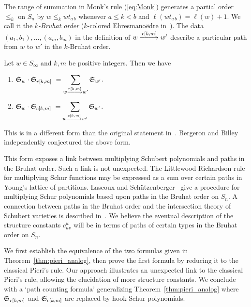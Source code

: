 The range of summation in Monk's rule (\ref{eq:Monk}) generates a partial 
order $\leq_k$ on $S_n$ by $w \leq_k w  t_{a\,b}$ whenever
$a\leq k<b$ and $\ell(w t_{a\,b}) = \ell(w)+1$.
We call it the {\em $k$-Bruhat order} 
($k$-colored Ehresmano\"edre 
in~\cite{Lascoux_Schutzenberger_Symmetry}).
The data $(a_1,b_1), \ldots,(a_m,b_m)$ in the definition
of $w\rkm w'$ describe a particular path from 
$w$ to $w'$ in the $k$-Bruhat order.
\bigskip


\begin{thm} \label{thm:pieri_analog}
Let $w\in S_{\infty}$ and $k,m$ be positive integers.
Then we have
\begin{enumerate}

\item ${\displaystyle 
{\frak S}_{w}\cdot {\frak S}_{r[k,m]} \ 
= \sum_{w \rkm w'}
{\frak S}_{w'}}$.
\smallskip

\item ${\displaystyle 
{\frak S}_{w}\cdot {\frak S}_{c[k,m]} \ 
= \sum_{w \ckm w'}
{\frak S}_{w'}}$.

\end{enumerate}
\end{thm}

This is in a different form than the original 
statement in~\cite{Lascoux_Schutzenberger_polynomes_schubert}.
Bergeron and Billey~\cite{Bergeron_Billey} 
independently conjectured the above form.

This form exposes a link between multiplying 
Schubert polynomials and paths in the Bruhat order.
Such a link is not unexpected.
The Littlewood-Richardson rule
for multiplying Schur functions may be expressed
as a sum over certain paths in Young's lattice of 
partitions.
Lascoux and 
Sch\"utzenberger~\cite{Lascoux_Schutzenberger_schubert_polynials_LR_rule} 
give a procedure for multiplying Schur polynomials 
based upon paths in the Bruhat order on $S_n$.
A connection between paths in the Bruhat order and the 
intersection theory of Schubert varieties is described
in~\cite{Hiller_intersections}.
We believe the eventual description of the structure 
constants $c^w_{uv}$ will be in terms
of paths of certain types in the  Bruhat order
on $S_n$.



We first establish the
equivalence of the two formulas given in Theorem~\ref{thm:pieri_analog},  
then prove the first formula by reducing it to the classical Pieri's rule.
Our approach illustrates an unexpected link to the classical Pieri's rule, 
allowing the elucidation of more structure constants.
We conclude with a `path counting formula' generalizing
Theorem~\ref{thm:pieri_analog} where
${\frak S}_{r[k,m]}$ and ${\frak S}_{c[k,m]}$ are replaced by
hook Schur polynomials.
\smallskip

